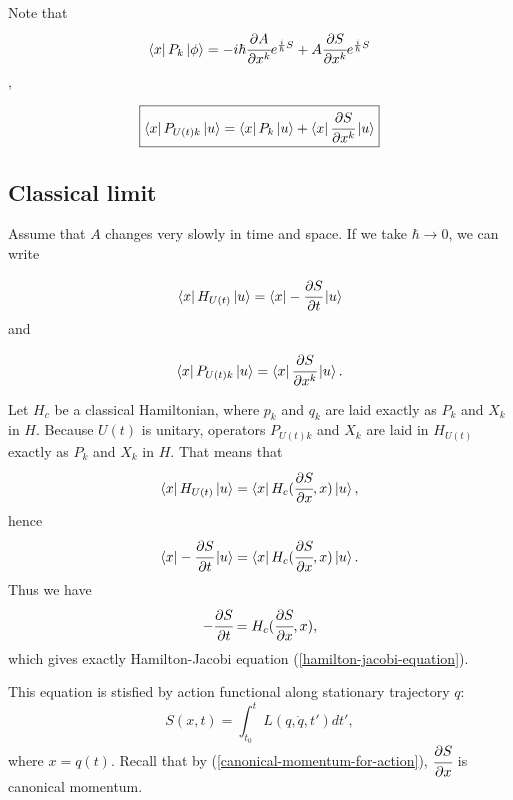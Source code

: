 \documentclass[main.tex]{subfiles}
\begin{document}
Note that
\begin{equation}
\bra{x}P_k\ket{\phi} = -i\hbar \cfrac{\partial A}{\partial x^k}e^{\frac{i}{\hbar}S}
+ A \cfrac{\partial S}{\partial x^k}e^{\frac{i}{\hbar}S}
\end{equation},

\begin{equation}
\boxed{
\bra{x}P_{U(t)k}\ket{u} = \bra{x}P_k\ket{u} + \bra{x} \cfrac{\partial S}{\partial x^k}\ket{u}}
\end{equation}
\subsection{Classical limit}

Assume that $A$ changes very slowly in time and space. If we take $\hbar \to 0$, we can write

\begin{equation}
\bra{x} H_{U(t)} \ket{u} = \bra{x} -\cfrac{\partial S}{\partial t} \ket{u}
\end{equation}
and

\begin{equation}
\bra{x} P_{U(t)k}\ket{u} = \bra{x} \cfrac{\partial S}{\partial x^k} \ket{u}.
\end{equation}

Let $H_c$ be a classical Hamiltonian, where $p_k$ and $q_k$ are laid exactly as $P_k$ and $X_k$ in $H$. Because $U(t)$ is unitary, operators $P_{U(t)k}$ and $X_k$ are laid in $H_{U(t)}$ exactly as $P_k$ and $X_k$ in $H$. That means that 
\begin{equation}
\bra{x} H_{U(t)} \ket{u} = \bra{x} H_c(\cfrac{\partial S}{\partial x}, x)\ket{u},
\end{equation}
hence
\begin{equation}
\bra{x}-\cfrac{\partial S}{\partial t} \ket{u} = \bra{x}H_c(\cfrac{\partial S}{\partial x}, x)\ket{u}.
\end{equation}
Thus we have 
\begin{equation}
-\cfrac{\partial S}{\partial t}  = H_c(\cfrac{\partial S}{\partial x}, x),
\end{equation}
which gives exactly Hamilton-Jacobi equation (\ref{hamilton-jacobi-equation}).

This equation is stisfied by action functional along stationary trajectory $q$:
\begin{equation}
S(x, t) = \int^t_{t_0} L(q, \dot{q}, t') dt',
\end{equation}
where $x = q(t)$.
Recall that by (\ref{canonical-momentum-for-action}), $\cfrac{\partial S}{\partial x}$ is canonical momentum.
\end{document}
